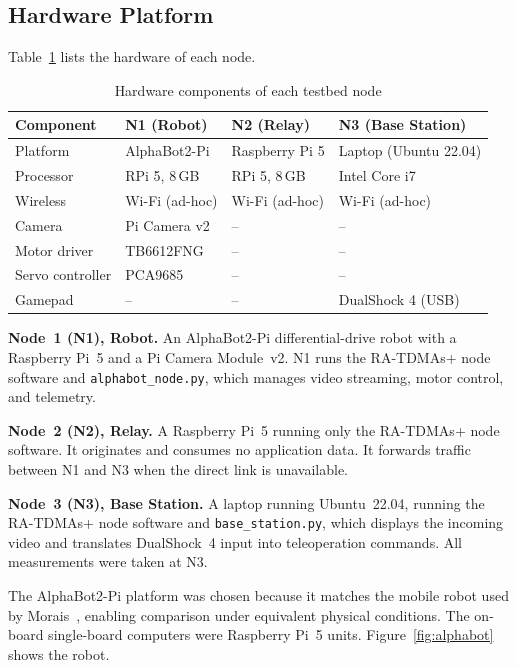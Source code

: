 \subsection{Hardware Platform}
\label{subsec:hardware}

Table~\ref{tab:hardware} lists the hardware of each node.

\begin{table}[h]
\centering
\caption{Hardware components of each testbed node}
\label{tab:hardware}
\begin{tabular}{llll}
\toprule
\textbf{Component} & \textbf{N1 (Robot)} & \textbf{N2 (Relay)} & \textbf{N3 (Base Station)} \\
\midrule
Platform         & AlphaBot2-Pi    & Raspberry Pi 5  & Laptop (Ubuntu 22.04) \\
Processor        & RPi 5, 8\,GB    & RPi 5, 8\,GB    & Intel Core i7 \\
Wireless         & Wi-Fi (ad-hoc)  & Wi-Fi (ad-hoc)  & Wi-Fi (ad-hoc) \\
Camera           & Pi Camera v2    & --              & --                    \\
Motor driver     & TB6612FNG       & --              & --                    \\
Servo controller & PCA9685         & --              & --                    \\
Gamepad          & --              & --              & DualShock 4 (USB)     \\
\bottomrule
\end{tabular}
\end{table}

\textbf{Node~1 (N1), Robot.} An AlphaBot2-Pi differential-drive robot with
a Raspberry Pi~5 and a Pi Camera Module~v2. N1 runs the RA-TDMAs+ node
software and \texttt{alphabot\_node.py}, which manages video streaming, motor
control, and telemetry.

\textbf{Node~2 (N2), Relay.} A Raspberry Pi~5 running only the RA-TDMAs+
node software. It originates and consumes no application data. It forwards
traffic between N1 and N3 when the direct link is unavailable.

\textbf{Node~3 (N3), Base Station.} A laptop running Ubuntu~22.04, running
the RA-TDMAs+ node software and \texttt{base\_station.py}, which displays the
incoming video and translates DualShock~4 input into teleoperation commands.
All measurements were taken at N3.

The AlphaBot2-Pi platform was chosen because it matches the mobile robot used
by Morais~\cite{morais2024synchronization}, enabling comparison under
equivalent physical conditions. The on-board single-board computers were
Raspberry Pi~5 units. Figure~\ref{fig:alphabot} shows the robot.

